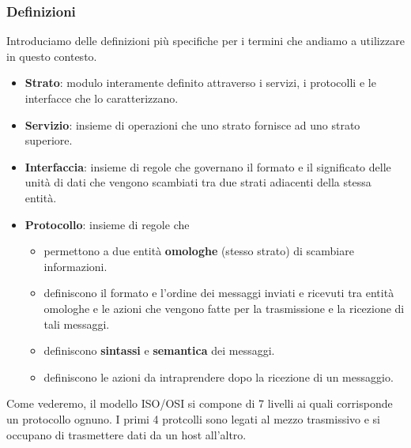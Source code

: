 \subsubsection{Definizioni}
Introduciamo delle definizioni più specifiche per i termini che andiamo a utilizzare in questo 
contesto.
\begin{itemize}
	\item \textbf{Strato}: modulo interamente definito attraverso i servizi, i protocolli e le 
		interfacce che lo caratterizzano.
	\item \textbf{Servizio}: insieme di operazioni che uno strato fornisce ad uno strato superiore.
	\item \textbf{Interfaccia}: insieme di regole che governano il formato e il significato delle 
		unità di dati che vengono scambiati tra due strati adiacenti della stessa entità.
	\item \textbf{Protocollo}: insieme di regole che
		\begin{itemize}
			\item permettono a due entità \textbf{omologhe} (stesso strato) di scambiare
				informazioni.
			\item definiscono il formato e l'ordine dei messaggi inviati e ricevuti tra entità
				omologhe e le azioni che vengono fatte per la trasmissione e la ricezione di 
				tali messaggi.
			\item definiscono \textbf{sintassi} e \textbf{semantica} dei messaggi.
			\item definiscono le azioni da intraprendere dopo la ricezione di un messaggio.
		\end{itemize}
\end{itemize}
Come vederemo, il modello ISO/OSI si compone di 7 livelli ai quali corrisponde un protocollo
ognuno. I primi 4 protcolli sono legati al mezzo trasmissivo e si occupano di trasmettere dati da
un host all'altro.

